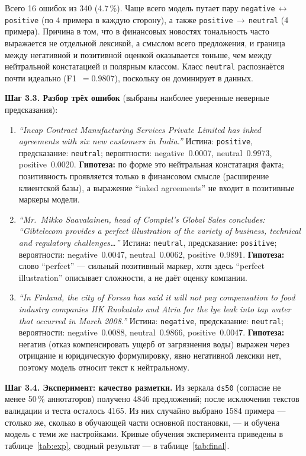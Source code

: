 \documentclass[14pt,a4paper]{extarticle}
\begin{document}
Всего 16 ошибок из 340 (4.7\,\%). Чаще всего модель путает пару
\texttt{negative}\,$\leftrightarrow$\,\texttt{positive} (по 4 примера в каждую
сторону), а также \texttt{positive}\,$\to$\,\texttt{neutral} (4 примера). Причина в
том, что в финансовых новостях тональность часто выражается не отдельной лексикой, а
смыслом всего предложения, и граница между негативной и позитивной оценкой
оказывается тоньше, чем между нейтральной констатацией и полярным классом. Класс
\texttt{neutral} распознаётся почти идеально (F1~$=0.9807$), поскольку он
доминирует в данных.

\textbf{Шаг 3.3. Разбор трёх ошибок} (выбраны наиболее уверенные неверные
предсказания):

\begin{enumerate}
    \item \textit{``Incap Contract Manufacturing Services Private Limited has inked
    agreements with six new customers in India.''} Истина: \texttt{positive},
    предсказание: \texttt{neutral}; вероятности: negative~0.0007,
    neutral~0.9973, positive~0.0020. \textbf{Гипотеза:} по форме это
    нейтральная констатация факта; позитивность проявляется только в финансовом
    смысле (расширение клиентской базы), а выражение ``inked agreements'' не
    входит в позитивные маркеры модели.
    \item \textit{``Mr.~Mikko Saavalainen, head of Comptel's Global Sales concludes:
    ``Gibtelecom provides a perfect illustration of the variety of business,
    technical and regulatory challenges\ldots''} Истина: \texttt{neutral},
    предсказание: \texttt{positive}; вероятности: negative~0.0047,
    neutral~0.0062, positive~0.9891. \textbf{Гипотеза:} слово ``perfect'' ---
    сильный позитивный маркер, хотя здесь ``perfect illustration'' описывает
    сложности, а не даёт оценку компании.
    \item \textit{``In Finland, the city of Forssa has said it will not pay
    compensation to food industry companies HK Ruokatalo and Atria for the lye leak
    into tap water that occurred in March 2008.''} Истина: \texttt{negative},
    предсказание: \texttt{neutral}; вероятности: negative~0.0088,
    neutral~0.9866, positive~0.0047. \textbf{Гипотеза:} негатив (отказ
    компенсировать ущерб от загрязнения воды) выражен через отрицание и юридическую
    формулировку, явно негативной лексики нет, поэтому модель относит текст к
    нейтральному.
\end{enumerate}

\textbf{Шаг 3.4. Эксперимент: качество разметки.} Из зеркала \texttt{ds50}
(согласие не менее 50\,\% аннотаторов) получено 4846 предложений; после исключения
текстов валидации и теста осталось 4165. Из них случайно выбрано 1584 примера ---
столько же, сколько в обучающей части основной постановки, --- и обучена модель с
теми же настройками. Кривые обучения эксперимента приведены в таблице~\ref{tab:exp},
сводный результат --- в таблице~\ref{tab:final}.
\end{document}
